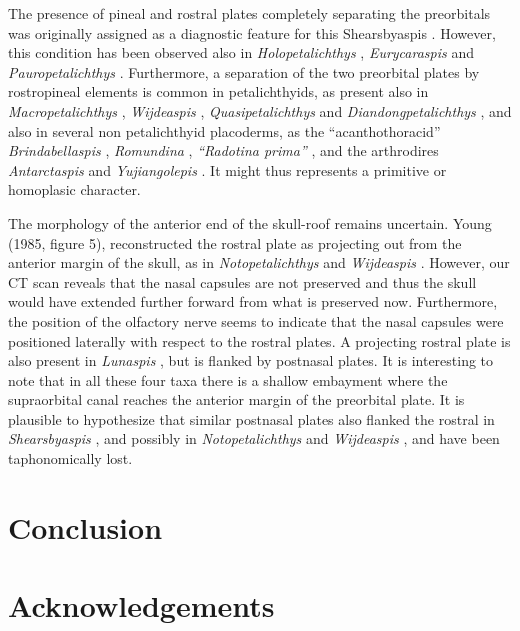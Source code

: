 \documentclass[12pt,letterpaper]{article}
\begin{document}
The presence of pineal and rostral plates completely separating the preorbitals was originally assigned as a diagnostic feature for this Shearsbyaspis \citep{Young1985}. However, this condition has been observed also in \textit{Holopetalichthys} \citep{Zhu1996a}, \textit{Eurycaraspis} \citep{Liu1991} and \textit{Pauropetalichthys} \citep{pan2015new}. Furthermore, a separation of the two preorbital plates by rostropineal elements is common in petalichthyids, as present also in \textit{Macropetalichthys} \citep{Stensi1925}, \textit{Wijdeaspis} \citep{Young1978}, \textit{Quasipetalichthys} \citep{Liu1973} and \textit{Diandongpetalichthys} \citep{Zhu1991}, and also in several non petalichthyid placoderms, as the “acanthothoracid” \textit{Brindabellaspis} \citep{Young1980}, \textit{Romundina} \citep{dupret2011skull}, \textit{“Radotina prima”} \citep{dupret2011skull}, and the arthrodires \textit{Antarctaspis} \citep{white1968devonian} and \textit{Yujiangolepis} \citep{Dupret2009}. It might thus represents a primitive or homoplasic character.

The morphology of the anterior end of the skull-roof remains uncertain. Young (1985, figure 5), reconstructed the rostral plate as projecting out from the anterior margin of the skull, as in \textit{Notopetalichthys} \citep{Woodward1941} and \textit{Wijdeaspis} \citep{Young1978}. However, our CT scan reveals that the nasal capsules are not preserved and thus the skull would have extended further forward from what is preserved now. Furthermore, the position of the olfactory nerve seems to indicate that the nasal capsules were positioned laterally with respect to the rostral plates. A projecting rostral plate is also present in \textit{Lunaspis} \citep{gross1961lunaspis}, but is flanked by postnasal plates. It is interesting to note that in all these four taxa there is a shallow embayment where the supraorbital canal reaches the anterior margin of the preorbital plate. It is plausible to hypothesize that similar postnasal plates also flanked the rostral in \textit{Shearsbyaspis} \citep{Young1985}, and possibly in \textit{Notopetalichthys} \citep{Woodward1941} and \textit{Wijdeaspis} \citep{Young1978}, and have been taphonomically lost.

\section{Conclusion}

\section{Acknowledgements}




\end{document}
